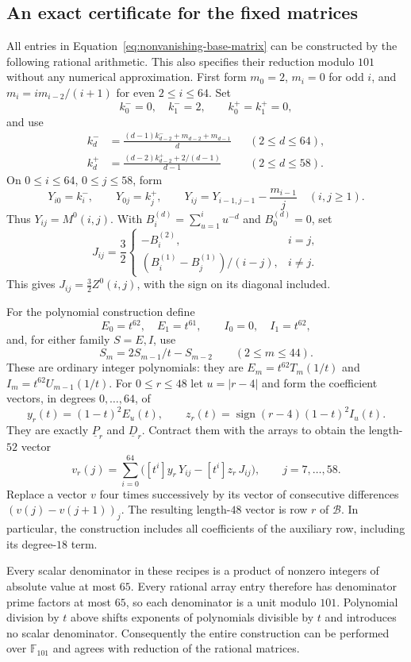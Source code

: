 \subsection{An exact certificate for the fixed matrices}

All entries in Equation~\eqref{eq:nonvanishing-base-matrix} can be
constructed by the following rational arithmetic. This also specifies
their reduction modulo $101$ without any numerical approximation.
First form $m_0=2$, $m_i=0$ for odd $i$, and
$m_i=i m_{i-2}/(i+1)$ for even $2\le i\le64$. Set
\[
 k^-_0=0,\quad k^-_1=2,\qquad k^+_0=k^+_1=0,
\]
and use
\begin{align*}
 k^-_d&=\frac{(d-1)k^-_{d-2}+m_{d-2}+m_{d-1}}{d}
                  &&(2\le d\le64),\\
 k^+_d&=\frac{(d-2)k^+_{d-2}+2/(d-1)}{d-1}
                  &&(2\le d\le58).
\end{align*}
On $0\le i\le64$, $0\le j\le58$, form
\[
 Y_{i0}=k^-_i,\qquad Y_{0j}=k^+_j,\qquad
 Y_{ij}=Y_{i-1,j-1}-\frac{m_{i-1}}j\quad(i,j\ge1).
\]
Thus $Y_{ij}=M^0(i,j)$. With $B_i^{(d)}=\sum_{u=1}^i u^{-d}$ and
$B_0^{(d)}=0$, set
\[
 J_{ij}=\frac32\begin{cases}
       -B_i^{(2)},&i=j,\\[2pt]
       (B_i^{(1)}-B_j^{(1)})/(i-j),&i\ne j.
      \end{cases}
\]
This gives $J_{ij}=\tfrac32Z^0(i,j)$, with the sign on its diagonal
included.

For the polynomial construction define
\[
 E_0=t^{62},\quad E_1=t^{61},\qquad I_0=0,\quad I_1=t^{62},
\]
and, for either family $S=E,I$, use
\[
 S_m=2S_{m-1}/t-S_{m-2}\qquad(2\le m\le44).
\]
These are ordinary integer polynomials: they are
$E_m=t^{62}T_m(1/t)$ and $I_m=t^{62}U_{m-1}(1/t)$.
For $0\le r\le48$ let $u=|r-4|$ and form the coefficient vectors,
in degrees $0,\ldots,64$, of
\[
 y_r(t)=(1-t)^2E_u(t),\qquad
 z_r(t)=\operatorname{sign}(r-4)(1-t)^2I_u(t).
\]
They are exactly $\underline P_r$ and $\underline D_r$.
Contract them with the arrays to obtain the length-$52$ vector
\[
 v_r(j)=\sum_{i=0}^{64}\bigl([t^i]y_r\,Y_{ij}
                                  -[t^i]z_r\,J_{ij}\bigr),
               \qquad j=7,\ldots,58.
\]
Replace a vector $v$ four times successively by its vector of consecutive
differences $(v(j)-v(j+1))_j$. The resulting length-$48$ vector is
row $r$ of $\mathcal B$. In particular, the construction includes all
coefficients of the auxiliary row, including its degree-$18$ term.

Every scalar denominator in these recipes is a product of nonzero integers
of absolute value at most $65$. Every rational array entry therefore has
denominator prime factors at most $65$, so each denominator is a unit
modulo $101$. Polynomial division by $t$ above shifts exponents of
polynomials divisible by $t$ and introduces no scalar denominator.
Consequently the entire construction can be performed over
$\mathbb F_{101}$ and agrees with reduction of the rational matrices.

